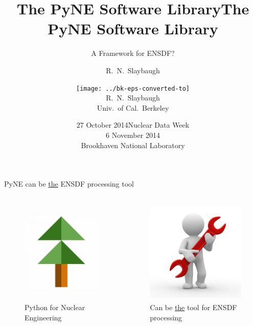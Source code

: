 \documentclass[xcolor=x11names,compress]{beamer}
\title{The PyNE Software Library}
\author{R.\ N.\ Slaybaugh}
\date{27 October 2014}
\renewcommand{\(}{\begin{columns}}
\renewcommand{\)}{\end{columns}}
\newcommand{\<}[1]{\begin{column}{#1}}
\renewcommand{\>}{\end{column}}
\begin{document}
\begin{frame}
\title{The PyNE Software Library}
\subtitle{A Framework for ENSDF?}
\author{
\texttt{[image: ../bk-eps-converted-to]}\\R.\ N.\ Slaybaugh \\ Univ.\ of Cal.\ Berkeley}

\date{Nuclear Data Week\\ 6 November 2014\\ Brookhaven National Laboratory}
\titlepage
\end{frame}

\begin{frame}{PyNE can be \underline{the} ENSDF processing tool}

	\begin{columns}
  	\begin{column}{0.45\textwidth}
 	   \begin{center}
 	   \begin{figure}
       \includegraphics[height=5cm]{../figs/pyne-icon-big}
       \caption{Python for Nuclear Engineering}
	   \end{figure}
 	   \end{center}
  	\end{column}
 	\begin{column}{0.45\textwidth}
 	   \begin{center}
 	   \begin{figure}
       \includegraphics[height=5cm]{../figs/person-with-tool}
       \caption{Can be \underline{the} tool for ENSDF processing}
	   \end{figure}
 	   \end{center}
  	\end{column}
	\end{columns}

\end{frame}
\end{document}
